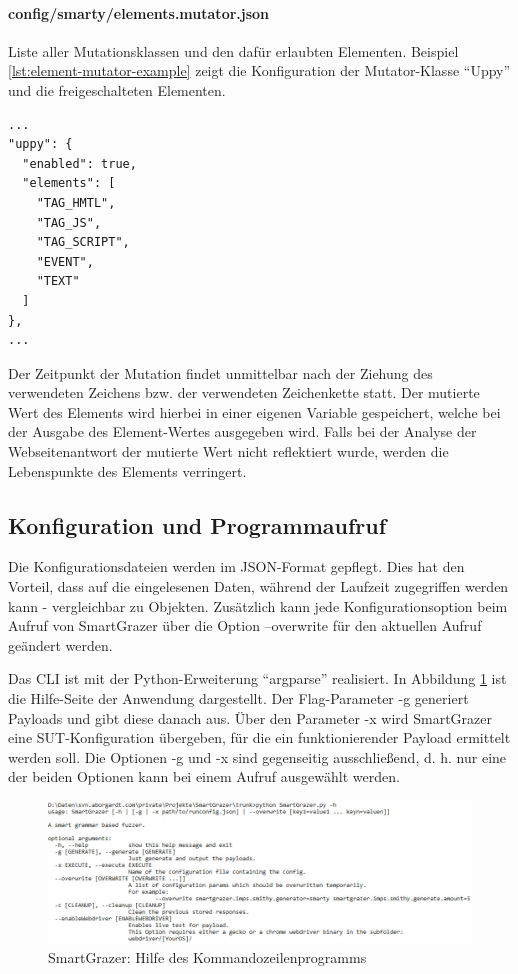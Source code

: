 	
\paragraph{config/smarty/elements.mutator.json} Liste aller Mutationsklassen und den dafür erlaubten Elementen. Beispiel \ref{lst:element-mutator-example} zeigt die Konfiguration der Mutator-Klasse ``Uppy'' und die freigeschalteten Elementen.

\begin{lstlisting}[caption={SmartGrazer: Auszug der Konfigurationsdatei ``elements.mutator.json''},label=lst:element-mutator-example]
...
"uppy": {
  "enabled": true,
  "elements": [
    "TAG_HMTL",
    "TAG_JS",
    "TAG_SCRIPT",
    "EVENT",
    "TEXT"
  ]
},
...
\end{lstlisting}

Der Zeitpunkt der Mutation findet unmittelbar nach der Ziehung des verwendeten Zeichens bzw. der verwendeten Zeichenkette statt. Der mutierte Wert des Elements wird hierbei in einer eigenen Variable gespeichert, welche bei der Ausgabe des Element-Wertes ausgegeben wird. Falls bei der Analyse der Webseitenantwort der mutierte Wert nicht reflektiert wurde, werden die Lebenspunkte des Elements verringert. 

\subsection{Konfiguration und Programmaufruf}\label{ssec:configuration}

Die Konfigurationsdateien werden im \gls{JSON}-Format gepflegt. Dies hat den Vorteil, dass auf die eingelesenen Daten, während der Laufzeit zugegriffen werden kann - vergleichbar zu Objekten. Zusätzlich kann jede Konfigurationsoption beim Aufruf von SmartGrazer über die Option --overwrite für den aktuellen Aufruf geändert werden.

Das \ac{CLI} ist mit der Python-Erweiterung ``argparse'' realisiert. In Abbildung \ref{fig:smartgrazer-cli-help} ist die Hilfe-Seite der Anwendung dargestellt. Der Flag-Parameter -g generiert Payloads und gibt diese danach aus. Über den Parameter -x wird SmartGrazer eine \ac{SUT}-Konfiguration übergeben, für die ein funktionierender Payload ermittelt werden soll. Die Optionen -g und -x sind gegenseitig ausschließend, d. h. nur eine der beiden Optionen kann bei einem Aufruf ausgewählt werden. 

\begin{figure}[htbp] 
	\centering
	\includegraphics[width=\textwidth]{contents/images/SmartGrazerCLIHelp}
	\caption{SmartGrazer: Hilfe des Kommandozeilenprogramms}
	\label{fig:smartgrazer-cli-help}
\end{figure}

